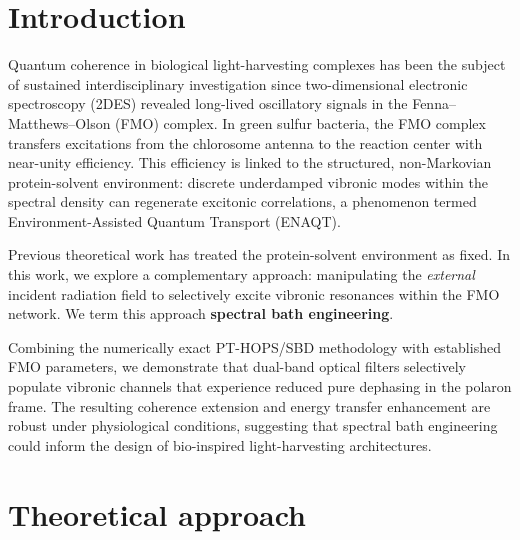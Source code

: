 \documentclass[11pt,a4paper]{article}
\begin{document}
\section{Introduction}

Quantum coherence in biological light-harvesting complexes has been the subject of sustained interdisciplinary investigation since two-dimensional electronic spectroscopy (2DES) revealed long-lived oscillatory signals in the Fenna--Matthews--Olson (FMO) complex.\cite{Engel2007,Panitchayangkoon2010} In green sulfur bacteria, the FMO complex transfers excitations from the chlorosome antenna to the reaction center with near-unity efficiency.\cite{Adolphs2006} This efficiency is linked to the structured, non-Markovian protein-solvent environment: discrete underdamped vibronic modes within the spectral density can regenerate excitonic correlations, a phenomenon termed Environment-Assisted Quantum Transport (ENAQT).\cite{Mohseni2008,Chin2013,Huelga2013}

Previous theoretical work has treated the protein-solvent environment as fixed.\cite{Tanimura1989,Ishizaki2009a,Cao2020} In this work, we explore a complementary approach: manipulating the \textit{external} incident radiation field to selectively excite vibronic resonances within the FMO network. We term this approach \textbf{spectral bath engineering}.

Combining the numerically exact PT-HOPS/SBD methodology\cite{Suess2014,Citty2024a} with established FMO parameters,\cite{Adolphs2006,Moix2011} we demonstrate that dual-band optical filters selectively populate vibronic channels that experience reduced pure dephasing in the polaron frame.\cite{Jang2008} The resulting coherence extension and energy transfer enhancement are robust under physiological conditions, suggesting that spectral bath engineering could inform the design of bio-inspired light-harvesting architectures.

\section{Theoretical approach}
\end{document}

